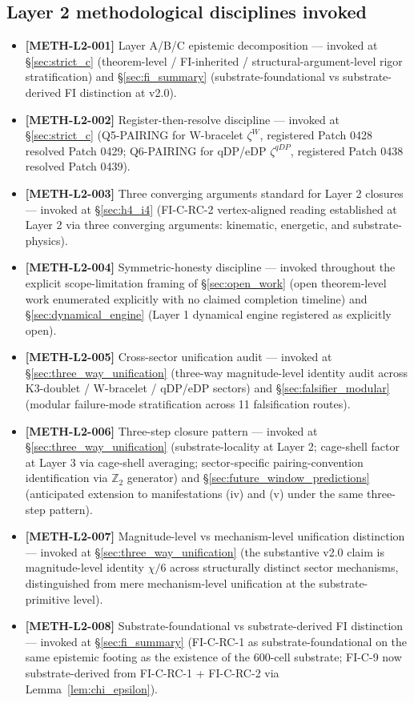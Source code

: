\documentclass[11pt,letterpaper]{article}
\begin{document}
\subsection{Layer 2 methodological disciplines invoked}\label{sec:meth_l2_xref}

\begin{itemize}\setlength\itemsep{0.15em}
    \item \textbf{[METH-L2-001]} Layer A/B/C epistemic decomposition --- invoked at \S\ref{sec:strict_c} (theorem-level / FI-inherited / structural-argument-level rigor stratification) and \S\ref{sec:fi_summary} (substrate-foundational vs substrate-derived FI distinction at v2.0).
    \item \textbf{[METH-L2-002]} Register-then-resolve discipline --- invoked at \S\ref{sec:strict_c} (Q5-PAIRING for W-bracelet $\zeta^W$, registered Patch 0428 resolved Patch 0429; Q6-PAIRING for qDP/eDP $\zeta^{qDP}$, registered Patch 0438 resolved Patch 0439).
    \item \textbf{[METH-L2-003]} Three converging arguments standard for Layer 2 closures --- invoked at \S\ref{sec:h4_i4} (FI-C-RC-2 vertex-aligned reading established at Layer 2 via three converging arguments: kinematic, energetic, and substrate-physics).
    \item \textbf{[METH-L2-004]} Symmetric-honesty discipline --- invoked throughout the explicit scope-limitation framing of \S\ref{sec:open_work} (open theorem-level work enumerated explicitly with no claimed completion timeline) and \S\ref{sec:dynamical_engine} (Layer 1 dynamical engine registered as explicitly open).
    \item \textbf{[METH-L2-005]} Cross-sector unification audit --- invoked at \S\ref{sec:three_way_unification} (three-way magnitude-level identity audit across K3-doublet / W-bracelet / qDP/eDP sectors) and \S\ref{sec:falsifier_modular} (modular failure-mode stratification across 11 falsification routes).
    \item \textbf{[METH-L2-006]} Three-step closure pattern --- invoked at \S\ref{sec:three_way_unification} (substrate-locality at Layer 2; cage-shell factor at Layer 3 via cage-shell averaging; sector-specific pairing-convention identification via $\mathbb{Z}_2$ generator) and \S\ref{sec:future_window_predictions} (anticipated extension to manifestations (iv) and (v) under the same three-step pattern).
    \item \textbf{[METH-L2-007]} Magnitude-level vs mechanism-level unification distinction --- invoked at \S\ref{sec:three_way_unification} (the substantive v2.0 claim is magnitude-level identity $\chi/6$ across structurally distinct sector mechanisms, distinguished from mere mechanism-level unification at the substrate-primitive level).
    \item \textbf{[METH-L2-008]} Substrate-foundational vs substrate-derived FI distinction --- invoked at \S\ref{sec:fi_summary} (FI-C-RC-1 as substrate-foundational on the same epistemic footing as the existence of the 600-cell substrate; FI-C-9 now substrate-derived from FI-C-RC-1 + FI-C-RC-2 via Lemma~\ref{lem:chi_epsilon}).
\end{itemize}
\end{document}

